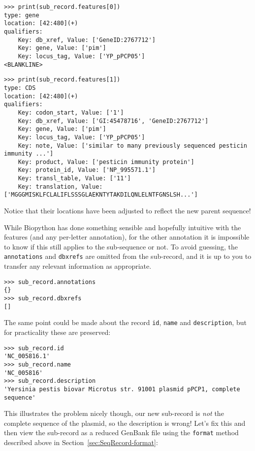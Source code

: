 \begin{verbatim}
>>> print(sub_record.features[0])
type: gene
location: [42:480](+)
qualifiers:
    Key: db_xref, Value: ['GeneID:2767712']
    Key: gene, Value: ['pim']
    Key: locus_tag, Value: ['YP_pPCP05']
<BLANKLINE>
\end{verbatim}
\begin{verbatim}
>>> print(sub_record.features[1])
type: CDS
location: [42:480](+)
qualifiers:
    Key: codon_start, Value: ['1']
    Key: db_xref, Value: ['GI:45478716', 'GeneID:2767712']
    Key: gene, Value: ['pim']
    Key: locus_tag, Value: ['YP_pPCP05']
    Key: note, Value: ['similar to many previously sequenced pesticin immunity ...']
    Key: product, Value: ['pesticin immunity protein']
    Key: protein_id, Value: ['NP_995571.1']
    Key: transl_table, Value: ['11']
    Key: translation, Value: ['MGGGMISKLFCLALIFLSSSGLAEKNTYTAKDILQNLELNTFGNSLSH...']
\end{verbatim}

\noindent Notice that their locations have been adjusted to reflect the new parent sequence!

While Biopython has done something sensible and hopefully intuitive with the features
(and any per-letter annotation), for the other annotation it is impossible to know if
this still applies to the sub-sequence or not. To avoid guessing, the \texttt{annotations}
and \texttt{dbxrefs} are omitted from the sub-record, and it is up to you to transfer
any relevant information as appropriate.

\begin{verbatim}
>>> sub_record.annotations
{}
>>> sub_record.dbxrefs
[]
\end{verbatim}

The same point could be made about the record \texttt{id}, \texttt{name}
and \texttt{description}, but for practicality these are preserved:

\begin{verbatim}
>>> sub_record.id
'NC_005816.1'
>>> sub_record.name
'NC_005816'
>>> sub_record.description
'Yersinia pestis biovar Microtus str. 91001 plasmid pPCP1, complete sequence'
\end{verbatim}

\noindent This illustrates the problem nicely though, our new sub-record is
\emph{not} the complete sequence of the plasmid, so the description is wrong!
Let's fix this and then view the sub-record as a reduced GenBank file using
the \texttt{format} method described above in Section~\ref{sec:SeqRecord-format}:

